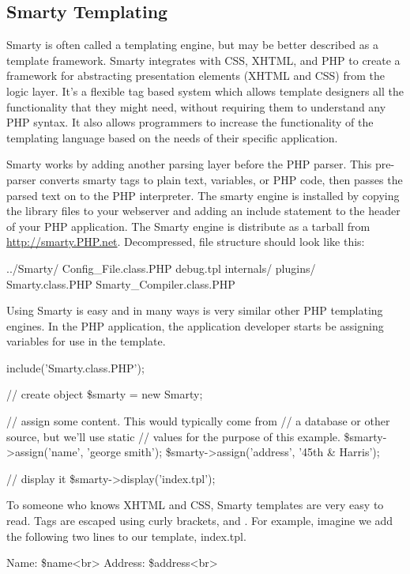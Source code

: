 \documentclass[a4paper,12pt]{report}
\begin{document}
\subsection{Smarty Templating}
Smarty is often called a templating engine, but may be better described as a template framework. 
Smarty integrates with CSS, XHTML, and PHP to create a framework for abstracting presentation elements (XHTML and CSS) from the logic layer. 
It's a flexible tag based system which allows template designers all the functionality that they might need, without requiring them to understand any PHP syntax.
It also allows programmers to increase the functionality of the templating language based on the needs of their specific application. 

 
Smarty works by adding another parsing layer before the PHP parser. 
This pre-parser converts smarty tags to plain text, variables, or PHP code, then passes the parsed text on to the PHP interpreter. 
The smarty engine is installed by copying the library files to your webserver and adding an include statement to the header of your PHP application. 
The Smarty engine is distribute as a tarball from \url{http://smarty.PHP.net}. 
Decompressed, file structure should look like this:

../Smarty/
                          Config_File.class.PHP
                          debug.tpl
                          internals/
                          plugins/
                          Smarty.class.PHP
                          Smarty_Compiler.class.PHP

Using Smarty is easy and in many ways is very similar other PHP templating engines. 
In the PHP application, the application developer starts be assigning variables for use in the template. 

include('Smarty.class.PHP');

// create object
\$smarty = new Smarty;

// assign some content. This would typically come from
// a database or other source, but we'll use static
// values for the purpose of this example.
\$smarty->assign('name', 'george smith');
\$smarty->assign('address', '45th & Harris');

// display it
\$smarty->display('index.tpl');


To someone who knows XHTML and CSS, Smarty templates are very easy to read. 
Tags are escaped using curly brackets, { and }. 
For example, imagine we add the following two lines to our template, index.tpl. 

Name: {\$name}<br>
Address: {\$address}<br>
\end{document}
